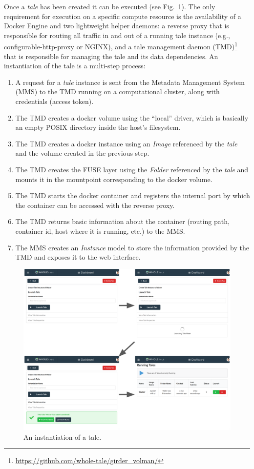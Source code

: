 \documentclass{elsarticle}
\begin{document}
Once a \emph{tale} has been created it can be executed (see Fig.~\ref{fig:instance}). The only requirement for execution on a specific compute resource is the availability of a Docker Engine
and two lightweight helper daemons: a reverse proxy that is responsible for routing all traffic in and out of a running tale instance (e.g., configurable-http-proxy or NGINX), and a tale management daemon (TMD)\footnote{\url{https://github.com/whole-tale/girder_volman/}} that is responsible for managing
the tale and its data dependencies. An instantiation of the tale is a multi-step process:
\begin{enumerate}
	\item A request for a \emph{tale} instance is sent from the Metadata Management System (MMS) to the TMD running on a computational cluster, along with credentials (access token).
    \item The TMD creates a docker volume using the ``local'' driver, which is basically an empty POSIX directory inside the host's filesystem.
    \item The TMD creates a docker instance using an \emph{Image} referenced by the \emph{tale} and the volume created in the previous step.
    \item The TMD creates the FUSE layer using the \emph{Folder} referenced by the \emph{tale} and mounts it in the mountpoint corresponding to the docker volume.
    \item The TMD starts the docker container and registers the internal port by which the container can be accessed with the reverse proxy.
    \item The TMD returns basic information about the container (routing path, container id, host where it is running, etc.) to the MMS.
    \item The MMS creates an \emph{Instance} model to store the information provided by the TMD and exposes it to the web interface.
\end{enumerate}

\begin{figure}[ht!]
\centering
  \includegraphics[trim=0in 3in 0in 0in,clip,width=0.75\columnwidth]{instance.png}
\caption{An instantiation of a tale. \label{fig:instance}}
\end{figure}
\end{document}
